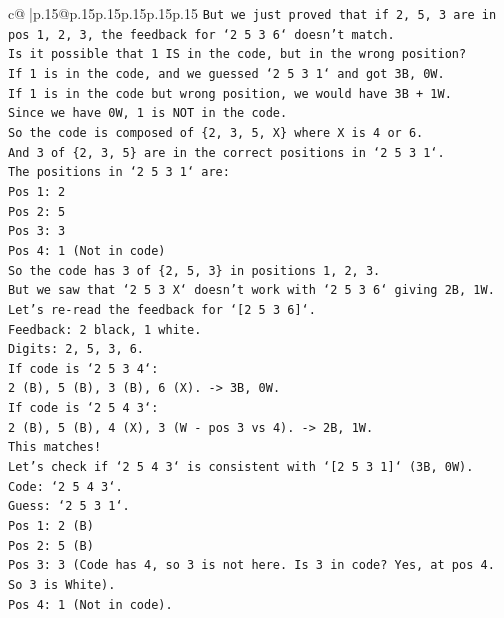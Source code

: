 \documentclass{article}
\begin{document}
{\begin{supertabular}{c@{$\;$}|p{.15\linewidth}@{}p{.15\linewidth}p{.15\linewidth}p{.15\linewidth}p{.15\linewidth}p{.15\linewidth}}
{{{\texttt{But we just proved that if 2, 5, 3 are in pos 1, 2, 3, the feedback for `2 5 3 6` doesn't match.} \\
\texttt{Is it possible that 1 IS in the code, but in the wrong position?} \\
\texttt{If 1 is in the code, and we guessed `2 5 3 1` and got 3B, 0W.} \\
\texttt{If 1 is in the code but wrong position, we would have 3B + 1W.} \\
\texttt{Since we have 0W, 1 is NOT in the code.} \\
\texttt{So the code is composed of \{2, 3, 5, X\} where X is 4 or 6.} \\
\texttt{And 3 of \{2, 3, 5\} are in the correct positions in `2 5 3 1`.} \\
\texttt{The positions in `2 5 3 1` are:} \\
\texttt{Pos 1: 2} \\
\texttt{Pos 2: 5} \\
\texttt{Pos 3: 3} \\
\texttt{Pos 4: 1 (Not in code)} \\
\texttt{So the code has 3 of \{2, 5, 3\} in positions 1, 2, 3.} \\
\texttt{But we saw that `2 5 3 X` doesn't work with `2 5 3 6` giving 2B, 1W.} \\
\texttt{Let's re{-}read the feedback for `{[}2 5 3 6{]}`.} \\
\texttt{Feedback: 2 black, 1 white.} \\
\texttt{Digits: 2, 5, 3, 6.} \\
\texttt{If code is `2 5 3 4`:} \\
\texttt{2 (B), 5 (B), 3 (B), 6 (X). {-}> 3B, 0W.} \\
\texttt{If code is `2 5 4 3`:} \\
\texttt{2 (B), 5 (B), 4 (X), 3 (W {-} pos 3 vs 4). {-}> 2B, 1W.} \\
\texttt{This matches!} \\
\texttt{Let's check if `2 5 4 3` is consistent with `{[}2 5 3 1{]}` (3B, 0W).} \\
\texttt{Code: `2 5 4 3`.} \\
\texttt{Guess: `2 5 3 1`.} \\
\texttt{Pos 1: 2 (B)} \\
\texttt{Pos 2: 5 (B)} \\
\texttt{Pos 3: 3 (Code has 4, so 3 is not here. Is 3 in code? Yes, at pos 4. So 3 is White).} \\
\texttt{Pos 4: 1 (Not in code).} \\
}}}
\end{supertabular}}
\end{document}
